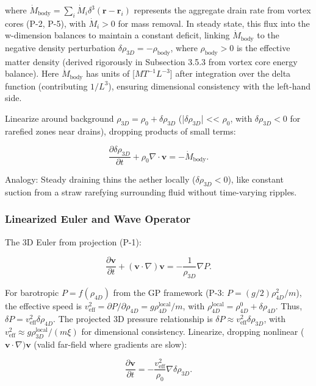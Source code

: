 \documentclass{article}
\begin{document}
where $\dot{M}_{\text{body}} = \sum_i \dot{M}_i \delta^3(\mathbf{r} - \mathbf{r}_i)$ represents the aggregate drain rate from vortex cores (P-2, P-5), with $\dot{M}_i > 0$ for mass removal. In steady state, this flux into the w-dimension balances to maintain a constant deficit, linking $\dot{M}_{\text{body}}$ to the negative density perturbation $\delta \rho_{3D} = -\rho_{\text{body}}$, where $\rho_{\text{body}} > 0$ is the effective matter density (derived rigorously in Subsection 3.5.3 from vortex core energy balance). Here $\dot{M}_{\text{body}}$ has units of [$M T^{-1} L^{-3}$] after integration over the delta function (contributing $1/L^3$), ensuring dimensional consistency with the left-hand side.

Linearize around background $\rho_{3D} = \rho_0 + \delta \rho_{3D}$ (|$ \delta \rho_{3D} $| << $\rho_0$, with $\delta \rho_{3D} < 0$ for rarefied zones near drains), dropping products of small terms:

\[
\frac{\partial \delta \rho_{3D}}{\partial t} + \rho_0 \nabla \cdot \mathbf{v} = -\dot{M}_{\text{body}}.
\]

Analogy: Steady draining thins the aether locally ($\delta \rho_{3D} < 0$), like constant suction from a straw rarefying surrounding fluid without time-varying ripples.

\subsubsection{Linearized Euler and Wave Operator}

The 3D Euler from projection (P-1):

\[
\frac{\partial \mathbf{v}}{\partial t} + (\mathbf{v} \cdot \nabla) \mathbf{v} = -\frac{1}{\rho_{3D}} \nabla P.
\]

For barotropic $P = f(\rho_{4D})$ from the GP framework (P-3: $P = (g/2) \rho_{4D}^2 / m$), the effective speed is $v_{\text{eff}}^2 = \partial P / \partial \rho_{4D} = g \rho_{4D}^{\text{local}} / m$, with $\rho_{4D}^{\text{local}} = \rho_{4D}^0 + \delta \rho_{4D}$. Thus, $\delta P = v_{\text{eff}}^2 \delta \rho_{4D}$. The projected 3D pressure relationship is $\delta P \approx v_{\text{eff}}^2 \delta \rho_{3D}$, with $v_{\text{eff}}^2 \approx g \rho_{3D}^{\text{local}} / (m \xi)$ for dimensional consistency. Linearize, dropping nonlinear ($\mathbf{v} \cdot \nabla) \mathbf{v}$ (valid far-field where gradients are slow):

\[
\frac{\partial \mathbf{v}}{\partial t} = -\frac{v_{\text{eff}}^2}{\rho_0} \nabla \delta \rho_{3D}.
\]
\end{document}
